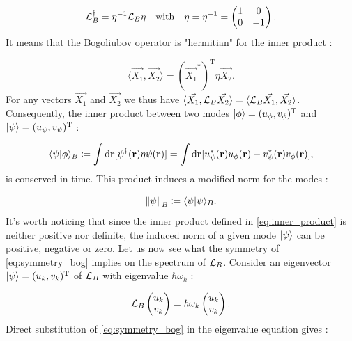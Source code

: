 \begin{equation}
    \Lbog^\dagger = \eta^{-1} \Lbog \eta \ \ \ \mathrm{with} \ \ \ \eta = \eta^{-1} =\begin{pmatrix}
        1 & 0 \\
        0 & -1
    \end{pmatrix}.
    \label{eq:symmetry_bog}
\end{equation}
It means that the Bogoliubov operator is "hermitian" for the inner product :

\begin{equation}
    \langle \vec{X_1},\vec{X_2} \rangle = (\vec{X_1}^*)^{\mathrm{T}} \eta \vec{X_2}.
    \label{eq:inner_product}
\end{equation}
For any vectors $\vec{X_1}$ and $\vec{X_2}$ we thus have $\langle \vec{X_1},\mathcal{L}_B\vec{X_2} \rangle = \langle \mathcal{L}_B\vec{X_1},\vec{X_2} \rangle$. 
Consequently, the inner product between two modes $\ket{\phi}= (u_{\phi}, v_{\phi})^\mathrm{T}$ and $\ket{\psi}=(u_{\psi}, v_{\psi})^\mathrm{T}$ :

\begin{equation}
    \langle \psi| \phi \rangle_B \coloneqq \int \mathrm{d}\mathbf{r}[\psi^\dagger(\mathbf{r})\eta\psi(\mathbf{r})] = \int \mathrm{d}\mathbf{r}[u_{\psi}^*(\mathbf{r})u_{\phi}(\mathbf{r})-v_{\psi}^*(\mathbf{r})v_{\phi}(\mathbf{r})],
    \label{eq:inner_product}
\end{equation}
is conserved in time. This product induces a modified norm for the modes : 

\begin{equation}
    \norm{\psi}_{B}\coloneqq \langle \psi| \psi \rangle_B.
    \label{eq:modified_norm}
\end{equation}
It's worth noticing that since the inner product defined in \autoref{eq:inner_product} is neither positive nor definite, the induced norm of a given mode $\ket{\psi}$
can be positive, negative or zero. Let us now see what the symmetry of \autoref{eq:symmetry_bog} implies on the spectrum of $\mathcal{L}_B$. Consider an eigenvector $\ket{\psi}= (u_k,v_k)^\mathrm{T}$ of $\mathcal{L}_B$ with eigenvalue $\hbar\omega_k$ : 

\begin{equation}
    \mathcal{L}_B \begin{pmatrix}
        u_k \\
        v_k
    \end{pmatrix} = \hbar\omega_k \begin{pmatrix}
        u_k \\
        v_k
    \end{pmatrix}.
\end{equation}
Direct substitution of \autoref{eq:symmetry_bog} in the eigenvalue equation gives :

